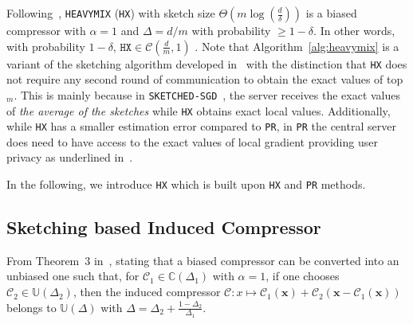 \documentclass[sigconf, anonymous, review]{acmart}
\newtheorem{lemma}{Lemma}
\begin{document}
Following~\citep{ivkin2019communication}, \texttt{HEAVYMIX} (\texttt{HX}) with sketch size $\Theta\left(m\log\left(\frac{d}{\delta}\right)\right)$ is a biased compressor with $\alpha=1$ and  $\Delta=d/m$ with probability $\geq1-\delta$.
In other words, with probability $1-\delta$, $\texttt{HX}\in \mathcal{C}(\frac{d}{m},1)$ . 
Note that Algorithm~\ref{alg:heavymix} is a variant of the sketching algorithm developed in~\citep{ivkin2019communication} with the distinction that \texttt{HX} does not require any second round of communication to obtain the exact values of top$_m$.
This is mainly because in \texttt{SKETCHED-SGD}~\citep{ivkin2019communication}, the server receives the exact values of \emph{the average of the sketches} while \texttt{HX} obtains exact local values.
Additionally, while \texttt{HX} has a smaller estimation error compared to \texttt{PR}, in \texttt{PR} the central server does need to have access to the exact values of local gradient providing user privacy as underlined in~\cite{li2019privacy}.

In the following, we introduce \texttt{HX} which is built upon \texttt{HX} and \texttt{PR} methods.

\vspace{-0.05in}
\subsection{Sketching based Induced Compressor}
\vspace{-0.05in}

From Theorem~$3$ in~\citep{horvath2020better}, stating that a biased compressor can be converted into an unbiased one such that, for $\mathcal{C}_1\in \mathbb{C}(\Delta_1)$ with $\alpha=1$, if one chooses $\mathcal{C}_2\in \mathbb{U}(\Delta_2)$, then the induced compressor $\mathcal{C}: x \mapsto \mathcal{C}_1(\mathbf{x})+\mathcal{C}_2\left(\mathbf{x}-\mathcal{C}_1\left(\mathbf{x}\right)\right)$ belongs to $\mathbb{U}(\Delta)$ with $\Delta=\Delta_2+\frac{1-\Delta_2}{\Delta_1}$. 
\end{document}
